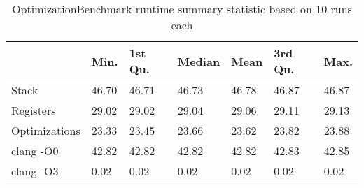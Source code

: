 \begin{table}[h!]
\centering
\begin{tabular}{p{}p{}p{}p{}p{}p{}p{}}
  \hline
 & Min. & 1st Qu. & Median & Mean & 3rd Qu. & Max. \\ 
  \hline
Stack & 46.70 & 46.71 & 46.73 & 46.78 & 46.87 & 46.87 \\ 
  Registers & 29.02 & 29.02 & 29.04 & 29.06 & 29.11 & 29.13 \\ 
  Optimizations & 23.33 & 23.45 & 23.66 & 23.62 & 23.82 & 23.88 \\ 
  clang -O0 & 42.82 & 42.82 & 42.82 & 42.82 & 42.83 & 42.85 \\ 
  clang -O3 & 0.02 & 0.02 & 0.02 & 0.02 & 0.02 & 0.02 \\ 
   \hline
\end{tabular}
\caption{OptimizationBenchmark runtime summary statistic based on 10 runs each}
\end{table}
